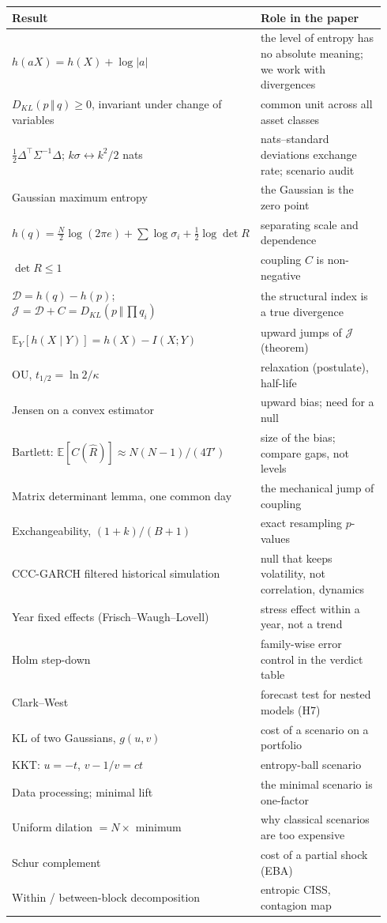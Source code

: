 \documentclass[11pt]{article}
\theoremstyle{plain}
\theoremstyle{definition}
\theoremstyle{remark}
\newcommand{\JJ}{\mathcal{J}}
\newcommand{\DD}{\mathcal{D}}
\newcommand{\E}{\mathbb{E}}
\newcommand{\KL}[2]{D_{KL}\!\left(#1\,\Vert\,#2\right)}
\begin{document}
\begin{center}
\small
\begin{tabular}{@{}p{0.42\linewidth}p{0.52\linewidth}@{}}
\toprule
Result & Role in the paper \\
\midrule
$h(aX)=h(X)+\log|a|$ & the level of entropy has no absolute meaning; we work
with divergences \\
$\KL{p}{q}\ge0$, invariant under change of variables & common unit across all
asset classes \\
$\tfrac12\Delta^\top\Sigma^{-1}\Delta$; $k\sigma\leftrightarrow k^2/2$ nats &
nats--standard deviations exchange rate; scenario audit \\
Gaussian maximum entropy & the Gaussian is the zero point \\
$h(q)=\tfrac N2\log(2\pi e)+\sum\log\sigma_i+\tfrac12\log\det R$ & separating
scale and dependence \\
$\det R\le1$ & coupling $C$ is non-negative \\
$\DD=h(q)-h(p)$; $\JJ=\DD+C=\KL{p}{\prod q_i}$ & the structural index is a
true divergence \\
$\E_Y[h(X\mid Y)]=h(X)-I(X;Y)$ & upward jumps of $\JJ$ (theorem) \\
OU, $t_{1/2}=\ln2/\kappa$ & relaxation (postulate), half-life \\
Jensen on a convex estimator & upward bias; need for a null \\
Bartlett: $\E[C(\hat R)]\approx N(N-1)/(4T')$ & size of the bias; compare gaps, not levels \\
Matrix determinant lemma, one common day & the mechanical jump of coupling \\
Exchangeability, $(1+k)/(B+1)$ & exact resampling $p$-values \\
CCC-GARCH filtered historical simulation & null that keeps volatility, not correlation, dynamics \\
Year fixed effects (Frisch--Waugh--Lovell) & stress effect within a year, not a trend \\
Holm step-down & family-wise error control in the verdict table \\
Clark--West & forecast test for nested models (H7) \\
KL of two Gaussians, $g(u,v)$ & cost of a scenario on a portfolio \\
KKT: $u=-t$, $v-1/v=ct$ & entropy-ball scenario \\
Data processing; minimal lift & the minimal scenario is one-factor \\
Uniform dilation $=N\times$ minimum & why classical scenarios are too
expensive \\
Schur complement & cost of a partial shock (EBA) \\
Within / between-block decomposition & entropic CISS, contagion map \\
\bottomrule
\end{tabular}
\end{center}
\end{document}
